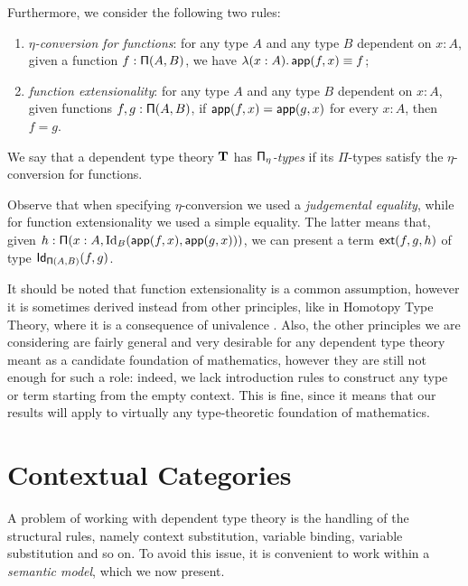 \noindent
Furthermore, we consider the following two rules:
\begin{enumerate}[resume]
  \item \emph{$\eta$-conversion for functions}: for any type $A$ and any type $B$
    dependent on $x:A$, given a function $f:\operatorname{\mathsf{\Pi}}(A,B)$, we have
    $\lambda(x:A).\operatorname{\mathsf{app}}(f,x)\equiv f$;
  \item \emph{function extensionality}: for any type $A$ and any type $B$ dependent on
    $x:A$, given functions $f,g:\operatorname{\mathsf{\Pi}}(A,B)$, if $\operatorname{\mathsf{app}}(f,x)=\operatorname{\mathsf{app}}(g,x)$ for every
    $x:A$, then $f=g$.
\end{enumerate}

\begin{defn}
  We say that a dependent type theory $\operatorname{\mathbf{T}}$ has \emph{$\operatorname{\mathsf{\Pi}_\eta}$-types} if its
  $\Pi$-types satisfy the $\eta$-conversion for functions.
\end{defn}

\begin{rmk}
  Observe that when specifying $\eta$-conversion we used a \emph{judgemental
  equality}, while for function extensionality we used a simple equality. The
  latter means that, given $h:\operatorname{\mathsf{\Pi}}(x:A,\operatorname{Id}_B(\operatorname{\mathsf{app}}(f,x),\operatorname{\mathsf{app}}(g,x)))$, we can
  present a term $\operatorname{\mathsf{ext}}(f,g,h)$ of type $\operatorname{\mathsf{Id}}_{\operatorname{\mathsf{\Pi}}(A,B)}(f,g)$.
\end{rmk}

\begin{rmk}
It should be noted that function extensionality is a common assumption, however
it is sometimes derived instead from other principles, like in Homotopy Type
Theory, where it is a consequence of univalence \cite[Ch.\ 4.9]{Uni13}.
Also, the other principles we are considering are fairly general and very
desirable for any dependent type theory meant as a candidate foundation of
mathematics, however they are still not enough for such a role: indeed, we lack
introduction rules to construct any type or term starting from the empty
context. This is fine, since it means that our results will apply to virtually
any type-theoretic foundation of mathematics.
\end{rmk}

\section{Contextual Categories}

A problem of working with dependent type theory is
the handling of the structural rules, namely context substitution, variable
binding, variable substitution and so on. To avoid this issue, it is convenient
to work within a \emph{semantic model}, which we now present.

